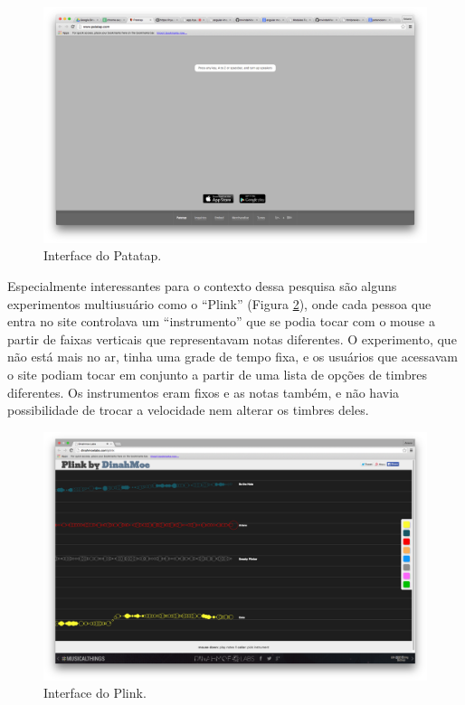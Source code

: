 \begin{figure}
    \caption{\label{patatap}Interface do Patatap.}
    
        \includegraphics[width=1\linewidth]{pictures/cap2/patatap}
    
\end{figure}

Especialmente interessantes para o contexto dessa pesquisa são alguns experimentos multiusuário como o ``Plink'' (Figura \ref{plink}), onde cada pessoa que entra no site controlava um ``instrumento'' que se podia tocar com o mouse a partir de faixas verticais que representavam notas diferentes. O experimento, que não está mais no ar, tinha uma grade de tempo fixa, e os usuários que acessavam o site podiam tocar em conjunto a partir de uma lista de opções de timbres diferentes. Os instrumentos eram fixos e as notas também, e não havia possibilidade de trocar a velocidade nem alterar os timbres deles. 

\begin{figure}
    \caption{\label{plink}Interface do Plink.}
    
        \includegraphics[width=1\linewidth]{pictures/cap2/plink}
    
\end{figure}

